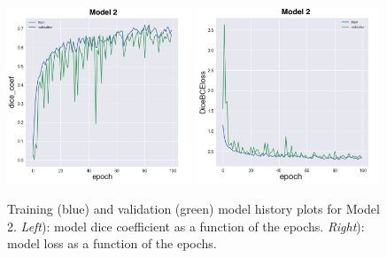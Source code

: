 \documentclass{standalone}
\begin{document}
\begin{figure}[htp]

    \centering
    \includegraphics[width=0.49\textwidth]{../images/dice_coef2.png}
	\includegraphics[width=0.49\textwidth]{../images/loss2.png}

    \caption{Training (blue) and validation (green) model history plots for Model 2. \textit{Left}): model dice coefficient as a function of the epochs. \textit{Right}): model loss as a function of the epochs.}
    \label{training2}
    
\end{figure}


\newpage
\end{document}

